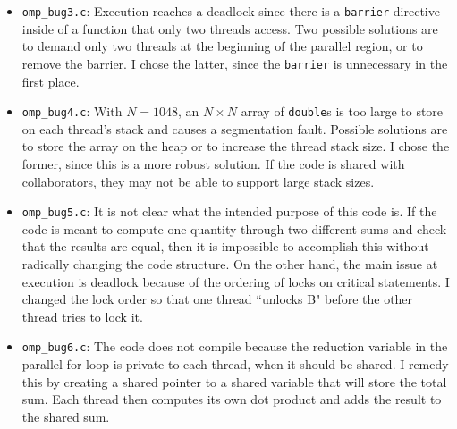\begin{questions}
\begin{solution}
\begin{itemize}
        \item \texttt{omp\_bug3.c}: Execution reaches a deadlock since there is a
        \texttt{barrier} directive inside of a function that only two threads access.
        Two possible solutions are to demand only two threads at the beginning
        of the parallel region, or to remove the barrier. I chose the latter, since
        the \texttt{barrier} is unnecessary in the first place.
        
        \item \texttt{omp\_bug4.c}: With $N=1048$, an $N\times N$ array of 
        \texttt{double}s is too large to store on each thread's stack and causes
        a segmentation fault. Possible solutions are to store the array on the heap
        or to increase the thread stack size. I chose the former, since this is a 
        more robust solution. If the code is shared with collaborators, they may
        not be able to support large stack sizes.
        
        \item \texttt{omp\_bug5.c}: It is not clear what the intended purpose of
        this code is. If the code is meant to compute one quantity through two
        different sums and check that the results are equal, then it is impossible
        to accomplish this without radically changing the code structure. On the
        other hand, the main issue at execution is deadlock because of the
        ordering of locks on critical statements. I changed the lock order so that
        one thread ``unlocks B" before the other thread tries to lock it.
        
        \item \texttt{omp\_bug6.c}: The code does not compile because the reduction
        variable in the parallel for loop is private to each thread, when it should
        be shared. I remedy this by creating a shared pointer to a shared variable
        that will store the total sum. Each thread then computes its own dot
        product and adds the result to the shared sum.
    \end{itemize}
\end{solution}







\end{questions}

